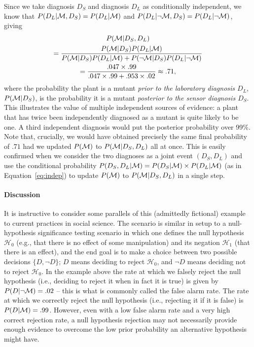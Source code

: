 Since we take diagnosis $D_S$ and diagnosis $D_L$ as conditionally independent, we know that $P(D_L|{\cal M},D_S)=P(D_L|{\cal M})$ and $P(D_L|\neg {\cal M},D_S)=P(D_L|\neg {\cal M})$, giving
\begin{multline*}
P({\cal M}|D_S, D_L) \\
= \frac{P({\cal M}|D_S)P(D_L|{\cal M})}{P({\cal M}|D_S)P(D_L|{\cal M}) + P(\neg {\cal M}|D_S)P(D_L|\neg {\cal M})} \\
= \frac{.047 \times .99}{.047 \times .99 + .953\times .02} \approx .71,
\end{multline*}
where the probability the plant is a mutant \textit{prior to the laboratory diagnosis $D_L$}, $P({\cal M}|D_S)$, is the probability it is a mutant \textit{posterior to the sensor diagnosis $D_S$}. This illustrates the value of multiple independent sources of evidence: a plant that has twice been independently diagnosed as a mutant is quite likely to be one. A third independent diagnosis would put the posterior probability over 99\%. {Note that, crucially, we would have obtained precisely the same final probability of $.71$ had we updated $P({\cal M})$ to $P({\cal M}|D_S,D_L)$ all at once. This is easily confirmed when we consider the two diagnoses as a joint event $(D_S,D_L)$ and use the conditional probability $P(D_S,D_L|{\cal M}) = P(D_S | {\cal M}) \times P(D_L | {\cal M})$ (as in Equation~\ref{eq:indep}) to update $P({\cal M})$ to $P({\cal M}|D_S,D_L)$ in a single step.}

\paragraph{Discussion} 
It is instructive to consider some parallels of this (admittedly fictional) example to current practices in social science. The scenario is similar in setup to a null-hypothesis significance testing scenario in which one defines the null hypothesis $\mathcal{H}_0$ (e.g., that there is no effect of some manipulation) and its negation $\mathcal{H}_1$ (that there is an effect), and the end goal is to make a choice between two possible decisions $\{D,\neg D\}$; $D$ means deciding to reject $\mathcal{H}_0$, and $\neg D$ means deciding not to reject $\mathcal{H}_0$. In the example above the rate at which we falsely reject the null hypothesis (i.e., deciding to reject it when in fact it is true) is given by $P(D|\neg{\cal M}) = .02$ -- this is what is commonly called the false alarm rate. The rate at which we correctly reject the null hypothesis (i.e., rejecting it if it is false) is $P(D|{\cal M}) = .99$. However, even with a low false alarm rate and a very high correct rejection rate, a null hypothesis rejection may not necessarily provide enough evidence to overcome the low prior probability an alternative hypothesis might have.


